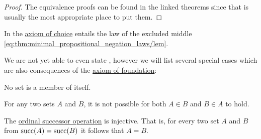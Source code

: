 \begin{proof}
  The equivalence proofs can be found in the linked theorems since that is usually the most appropriate place to put them.
\end{proof}

\begin{theorem}\label{thm:diaconescu_goodman_myhill_theorem}
  In \hyperref[def:zfc]{} the \hyperref[def:zfc/choice]{axiom of choice} entails the law of the excluded middle \eqref{eq:thm:minimal_propositional_negation_laws/lem}.
\end{theorem}

\begin{proposition}\label{thm:simple_foundation_theorems}
  We are not yet able to even state , however we will list several special cases which are also consequences of the \hyperref[def:zfc/foundation]{axiom of foundation}:

  \begin{thmenum}
     No set is a member of itself.

     For any two sets \( A \) and \( B \), it is not possible for both \( A \in B \) and \( B \in A \) to hold.

     The \hyperref[def:ordinal_successor]{ordinal successor operation} is injective. That is, for every two set \( A \) and \( B \) from \( \operatorname{succ}(A) = \operatorname{succ}(B) \) it follows that \( A = B \).
  \end{thmenum}
\end{proposition}
